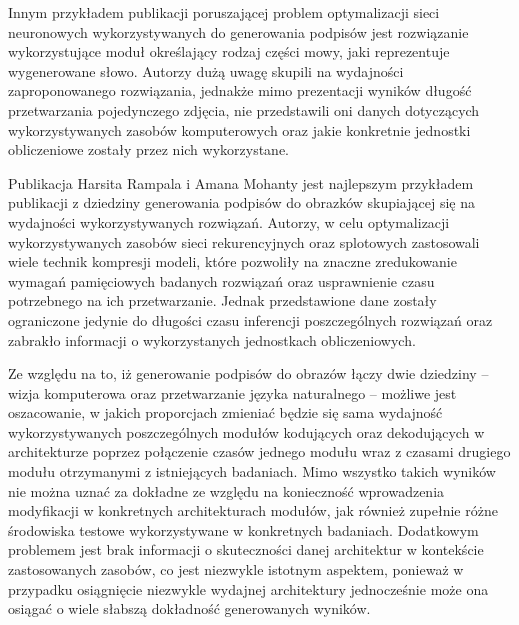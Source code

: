 Innym przykładem publikacji poruszającej problem optymalizacji sieci neuronowych wykorzystywanych do generowania podpisów jest rozwiązanie \cite{Deshpande_2019_CVPR} wykorzystujące moduł określający rodzaj części mowy, jaki reprezentuje wygenerowane słowo. Autorzy dużą uwagę skupili na wydajności zaproponowanego rozwiązania, jednakże mimo prezentacji wyników długość przetwarzania pojedynczego zdjęcia, nie przedstawili oni danych dotyczących wykorzystywanych zasobów komputerowych oraz jakie konkretnie jednostki obliczeniowe zostały przez nich wykorzystane.

Publikacja Harsita Rampala i Amana Mohanty \cite{rampal2020efficient} jest najlepszym przykładem publikacji z dziedziny generowania podpisów do obrazków skupiającej się na wydajności wykorzystywanych rozwiązań. Autorzy, w celu optymalizacji wykorzystywanych zasobów sieci rekurencyjnych oraz splotowych zastosowali wiele technik kompresji modeli, które pozwoliły na znaczne zredukowanie wymagań pamięciowych badanych rozwiązań oraz usprawnienie czasu potrzebnego na ich przetwarzanie. Jednak przedstawione dane zostały ograniczone jedynie do długości czasu inferencji poszczególnych rozwiązań oraz zabrakło informacji o wykorzystanych jednostkach obliczeniowych.

Ze względu na to, iż generowanie podpisów do obrazów łączy dwie dziedziny -- wizja komputerowa oraz przetwarzanie języka naturalnego -- możliwe jest oszacowanie, w jakich proporcjach zmieniać będzie się sama wydajność wykorzystywanych poszczególnych modułów kodujących oraz dekodujących w architekturze poprzez połączenie czasów jednego modułu wraz z czasami drugiego modułu otrzymanymi z istniejących badaniach. Mimo wszystko takich wyników nie można uznać za dokładne ze względu na konieczność wprowadzenia modyfikacji w konkretnych architekturach modułów, jak również zupełnie różne środowiska testowe wykorzystywane w konkretnych badaniach. Dodatkowym problemem jest brak informacji o skuteczności danej architektur w kontekście zastosowanych zasobów, co jest niezwykle istotnym aspektem, ponieważ w przypadku osiągnięcie niezwykle wydajnej architektury jednocześnie może ona osiągać o wiele słabszą dokładność generowanych wyników.
